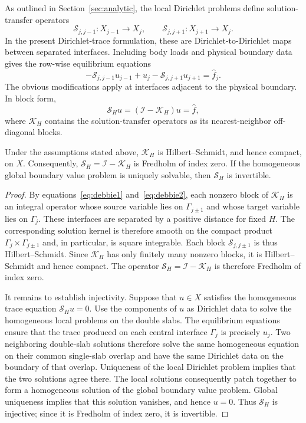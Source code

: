 \documentclass[final,onefignum,onetabnum]{siamart250211}
\theoremstyle{definition}
\begin{document}
As outlined in Section~\ref{sec:analytic}, the local Dirichlet problems define solution-transfer operators
\[
  \mathcal S_{j,j-1}:X_{j-1}\to X_j,
  \qquad
  \mathcal S_{j,j+1}:X_{j+1}\to X_j.
\]
In the present Dirichlet-trace formulation, these are Dirichlet-to-Dirichlet maps between separated interfaces.  Including body loads and physical boundary data gives the row-wise equilibrium equations
\begin{equation}
  -\mathcal S_{j,j-1}u_{j-1}+u_j-\mathcal S_{j,j+1}u_{j+1}
  =\widehat f_j.
  \label{eq:continuum_trace_row}
\end{equation}
The obvious modifications apply at interfaces adjacent to the physical boundary.  In block form,
\begin{equation}
  \mathcal S_H u=(\mathcal I-\mathcal K_H)u=\widehat f,
  \label{eq:continuum_trace_operator}
\end{equation}
where $\mathcal K_H$ contains the solution-transfer operators as its nearest-neighbor off-diagonal blocks.

\begin{proposition}
\label{prop:continuum_fredholm}
Under the assumptions stated above, $\mathcal K_H$ is Hilbert--Schmidt, and hence compact, on $X$.  Consequently, $\mathcal S_H=\mathcal I-\mathcal K_H$ is Fredholm of index zero.  If the homogeneous global boundary value problem is uniquely solvable, then $\mathcal S_H$ is invertible.
\end{proposition}

\begin{proof}
By equations~\eqref{eq:debbie1} and~\eqref{eq:debbie2}, each nonzero block of $\mathcal K_H$ is an integral operator whose source variable lies on $\Gamma_{j\pm1}$ and whose target variable lies on $\Gamma_j$.  These interfaces are separated by a positive distance for fixed $H$.  The corresponding solution kernel is therefore smooth on the compact product $\Gamma_j\times\Gamma_{j\pm1}$ and, in particular, is square integrable.  Each block $\mathcal S_{j,j\pm1}$ is thus Hilbert--Schmidt.  Since $\mathcal K_H$ has only finitely many nonzero blocks, it is Hilbert--Schmidt and hence compact.  The operator $\mathcal S_H=\mathcal I-\mathcal K_H$ is therefore Fredholm of index zero.

It remains to establish injectivity.  Suppose that $u\in X$ satisfies the homogeneous trace equation $\mathcal S_Hu=0$.  Use the components of $u$ as Dirichlet data to solve the homogeneous local problems on the double slabs.  The equilibrium equations ensure that the trace produced on each central interface $\Gamma_j$ is precisely $u_j$.  Two neighboring double-slab solutions therefore solve the same homogeneous equation on their common single-slab overlap and have the same Dirichlet data on the boundary of that overlap.  Uniqueness of the local Dirichlet problem implies that the two solutions agree there.  The local solutions consequently patch together to form a homogeneous solution of the global boundary value problem.  Global uniqueness implies that this solution vanishes, and hence $u=0$.  Thus $\mathcal S_H$ is injective; since it is Fredholm of index zero, it is invertible.
\end{proof}
\end{document}
